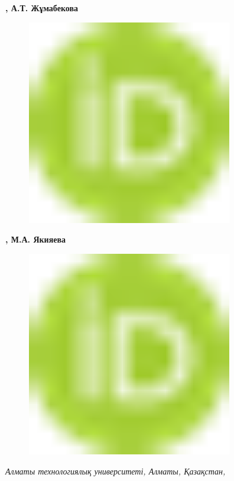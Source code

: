 {\bfseries , А.Т.
Жұмабекова}
\begin{figure}[H]
	\centering
	\includegraphics[width=0.8\textwidth]{media/pish/image10}
	\caption*{}
\end{figure}
{\bfseries ,
М.А.
Якияева}
\begin{figure}[H]
	\centering
	\includegraphics[width=0.8\textwidth]{media/pish/image10}
	\caption*{}
\end{figure}
{\bfseries \textsuperscript{\envelope }}

\emph{Алматы технологиялық университеті, Алматы, Қазақстан,}

